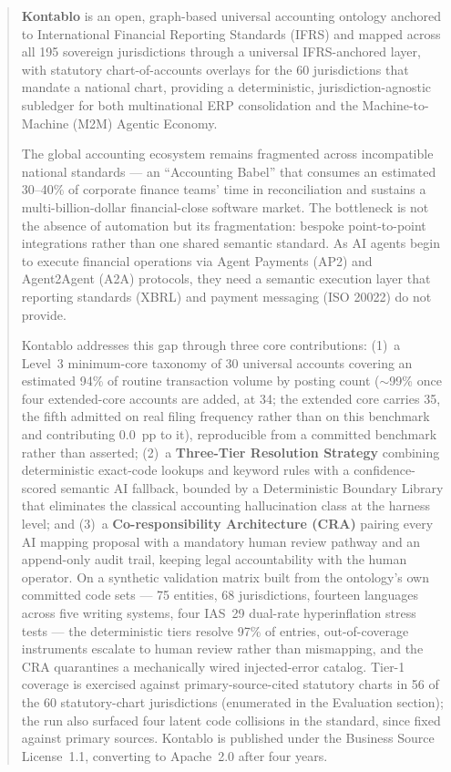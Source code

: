 \begin{abstract}
\textbf{Kontablo} is an open, graph-based universal accounting ontology anchored to International Financial Reporting Standards (IFRS) and mapped across all 195 sovereign jurisdictions through a universal IFRS-anchored layer, with statutory chart-of-accounts overlays for the 60 jurisdictions that mandate a national chart, providing a deterministic, jurisdiction-agnostic subledger for both multinational ERP consolidation and the Machine-to-Machine (M2M) Agentic Economy.

The global accounting ecosystem remains fragmented across incompatible national standards --- an ``Accounting Babel'' that consumes an estimated 30--40\% of corporate finance teams' time in reconciliation and sustains a multi-billion-dollar financial-close software market. The bottleneck is not the absence of automation but its fragmentation: bespoke point-to-point integrations rather than one shared semantic standard. As AI agents begin to execute financial operations via Agent Payments (AP2) and Agent2Agent (A2A) protocols, they need a semantic execution layer that reporting standards (XBRL) and payment messaging (ISO 20022) do not provide.

Kontablo addresses this gap through three core contributions: (1)~a Level~3 minimum-core taxonomy of 30 universal accounts covering an estimated 94\% of routine transaction volume by posting count ($\sim$99\% once four extended-core accounts are added, at 34; the extended core carries 35, the fifth admitted on real filing frequency rather than on this benchmark and contributing 0.0~pp to it), reproducible from a committed benchmark rather than asserted; (2)~a \textbf{Three-Tier Resolution Strategy} combining deterministic exact-code lookups and keyword rules with a confidence-scored semantic AI fallback, bounded by a Deterministic Boundary Library that eliminates the classical accounting hallucination class at the harness level; and (3)~a \textbf{Co-responsibility Architecture (CRA)} pairing every AI mapping proposal with a mandatory human review pathway and an append-only audit trail, keeping legal accountability with the human operator. On a synthetic validation matrix built from the ontology's own committed code sets --- 75 entities, 68 jurisdictions, fourteen languages across five writing systems, four IAS~29 dual-rate hyperinflation stress tests --- the deterministic tiers resolve 97\% of entries, out-of-coverage instruments escalate to human review rather than mismapping, and the CRA quarantines a mechanically wired injected-error catalog. Tier-1 coverage is exercised against primary-source-cited statutory charts in 56 of the 60 statutory-chart jurisdictions (enumerated in the Evaluation section); the run also surfaced four latent code collisions in the standard, since fixed against primary sources. Kontablo is published under the Business Source License~1.1, converting to Apache~2.0 after four years.
\end{abstract}

